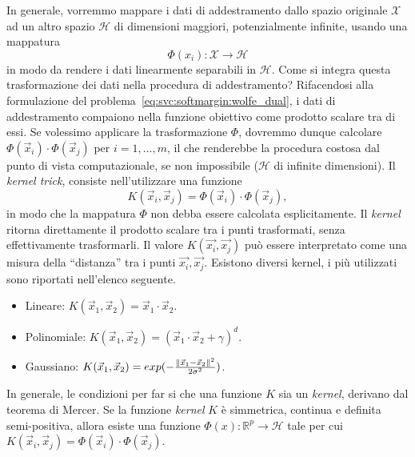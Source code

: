 In generale, vorremmo mappare i dati di addestramento dallo spazio originale $\mathcal{X}$ ad un altro spazio $\mathcal{H}$ di dimensioni maggiori, potenzialmente infinite, usando una mappatura
\begin{equation}
\label{eq:generic_kernel_mapping}
\Phi(x_i) : \mathcal{X} \rightarrow \mathcal{H}
\end{equation}
in modo da rendere i dati linearmente separabili in $\mathcal{H}$.
%
%
Come si integra questa trasformazione dei dati nella procedura di addestramento? Rifacendosi alla formulazione del problema~\ref{eq:svc:softmargin:wolfe_dual}, i dati di addestramento compaiono nella funzione obiettivo come prodotto scalare tra di essi. Se volessimo applicare la trasformazione $\Phi$, dovremmo dunque calcolare $\Phi(\Vec{x}_i)\cdot\Phi(\Vec{x}_j)$ per $i=1,\dots,m$, il che renderebbe la procedura costosa dal punto di vista computazionale, se non impossibile ($\mathcal{H}$ di infinite dimensioni). Il \emph{kernel trick}, consiste nell'utilizzare una funzione 
$$K(\Vec{x}_i, \Vec{x}_j) = \Phi(\Vec{x}_i)\cdot\Phi(\Vec{x}_j),$$ in modo che la mappatura $\Phi$ non debba essere calcolata esplicitamente. Il \emph{kernel} ritorna direttamente il prodotto scalare tra i punti trasformati, senza effettivamente trasformarli. Il valore $K(\Vec{x_i}, \Vec{x_j})$ può essere interpretato come una misura della ``distanza'' tra i punti $\Vec{x_i}, \Vec{x_j}$.
Esistono diversi kernel, i più utilizzati sono riportati nell'elenco seguente.
\begin{itemize}
    \item Lineare: $K(\Vec{x}_1, \Vec{x}_2) = \Vec{x}_1\cdot\Vec{x}_2$.
    \item Polinomiale: $K(\Vec{x}_1, \Vec{x}_2) = (\Vec{x}_1\cdot\Vec{x}_2 + \gamma)^d$.
    \item Gaussiano: $K(\Vec{x}_1, \Vec{x}_2) = exp({-\frac{\|\Vec{x}_1 - \Vec{x}_2\|^2}{2 \sigma^2}})$.
\end{itemize}
%
In generale, le condizioni per far si che una funzione $K$ sia un \emph{kernel}, derivano dal teorema di Mercer. Se la funzione \emph{kernel} $K$ è simmetrica, continua e definita semi-positiva, allora esiste una funzione $\Phi(x) : \mathbb{R}^p \rightarrow \mathcal{H}$ tale per cui $K(\Vec{x}_i, \Vec{x}_j) = \Phi(\Vec{x}_i)\cdot\Phi(\Vec{x}_j)$. 

